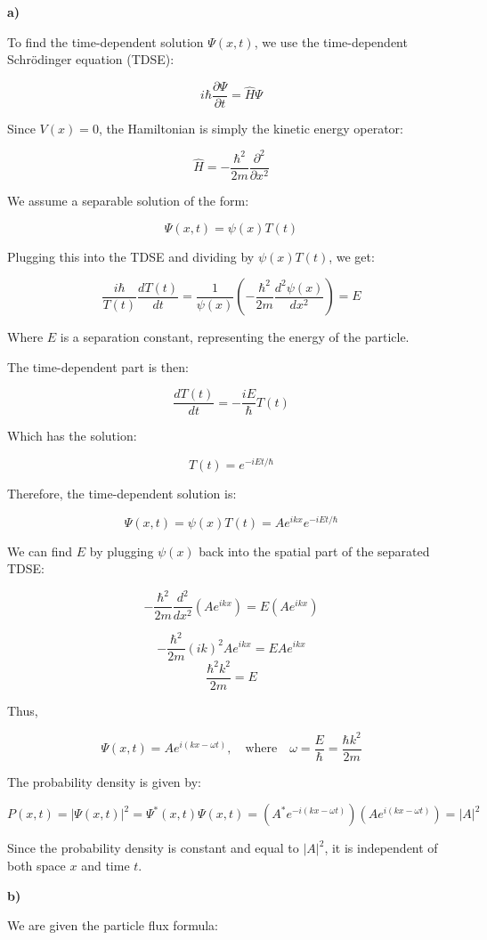 \documentclass{article}
\begin{document}
\textbf{a)}

To find the time-dependent solution $\Psi(x,t)$, we use the time-dependent Schrödinger equation (TDSE):

\[
i\hbar \frac{\partial \Psi}{\partial t} = \hat{H} \Psi
\]

Since $V(x) = 0$, the Hamiltonian is simply the kinetic energy operator:

\[
\hat{H} = -\frac{\hbar^2}{2m} \frac{\partial^2}{\partial x^2}
\]

We assume a separable solution of the form:

\[
\Psi(x,t) = \psi(x) T(t)
\]

Plugging this into the TDSE and dividing by $\psi(x) T(t)$, we get:

\[
\frac{i\hbar}{T(t)} \frac{dT(t)}{dt} = \frac{1}{\psi(x)} \left( -\frac{\hbar^2}{2m} \frac{d^2 \psi(x)}{dx^2} \right) = E
\]

Where $E$ is a separation constant, representing the energy of the particle.

The time-dependent part is then:

\[
\frac{dT(t)}{dt} = -\frac{iE}{\hbar} T(t)
\]

Which has the solution:

\[
T(t) = e^{-iEt/\hbar}
\]

Therefore, the time-dependent solution is:

\[
\Psi(x,t) = \psi(x) T(t) = A e^{ikx} e^{-iEt/\hbar}
\]

We can find $E$ by plugging $\psi(x)$ back into the spatial part of the separated TDSE:

\[
-\frac{\hbar^2}{2m} \frac{d^2}{dx^2} (Ae^{ikx}) = E(Ae^{ikx})
\]

\[
-\frac{\hbar^2}{2m} (ik)^2 Ae^{ikx} = E Ae^{ikx}
\]
\[
\frac{\hbar^2 k^2}{2m} = E
\]

Thus,

\[
\Psi(x,t) = A e^{i(kx - \omega t)}, \quad \text{where} \quad \omega = \frac{E}{\hbar} = \frac{\hbar k^2}{2m}
\]

The probability density is given by:

\[
P(x,t) = |\Psi(x,t)|^2 = \Psi^*(x,t) \Psi(x,t) = (A^* e^{-i(kx - \omega t)}) (A e^{i(kx - \omega t)}) = |A|^2
\]

Since the probability density is constant and equal to $|A|^2$, it is independent of both space $x$ and time $t$.

\textbf{b)}

We are given the particle flux formula:
\end{document}

